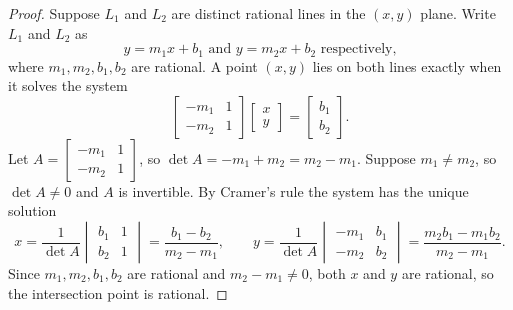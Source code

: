 \begin{proof}
    Suppose $L_1$ and $L_2$ are distinct rational lines in the $(x, y)$ plane.
    Write $L_1$ and $L_2$ as
    \[y = m_1 x + b_1 \text{ and } y = m_2 x + b_2 \text{ respectively,}\]
    where $m_1, m_2, b_1, b_2$ are rational.
    A point $(x, y)$ lies on both lines exactly when it solves the system
    \[
    \begin{bmatrix}
        -m_1 & 1 \\
        -m_2 & 1
    \end{bmatrix}
    \begin{bmatrix}
        x \\ y
    \end{bmatrix} =
    \begin{bmatrix}
        b_1 \\ b_2
    \end{bmatrix}.
    \]
    Let $A = \begin{bmatrix} -m_1 & 1 \\ -m_2 & 1 \end{bmatrix}$, so $\det A = -m_1 + m_2 = m_2 - m_1$.
    Suppose $m_1 \ne m_2$, so $\det A \ne 0$ and $A$ is invertible.
    By Cramer's rule the system has the unique solution
    \[
    x = \frac{1}{\det A}\begin{vmatrix} b_1 & 1 \\ b_2 & 1 \end{vmatrix}
        = \frac{b_1 - b_2}{m_2 - m_1},
    \qquad
    y = \frac{1}{\det A}\begin{vmatrix} -m_1 & b_1 \\ -m_2 & b_2 \end{vmatrix}
        = \frac{m_2 b_1 - m_1 b_2}{m_2 - m_1}.
    \]
    Since $m_1, m_2, b_1, b_2$ are rational and $m_2 - m_1 \ne 0$, both $x$ and $y$ are rational,
    so the intersection point is rational.
\end{proof}

